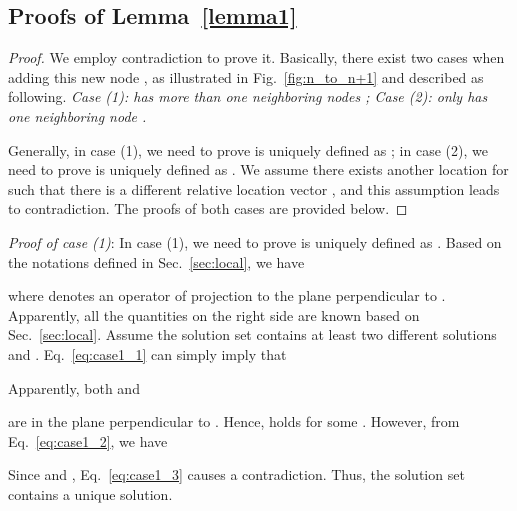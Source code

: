 \documentclass{article}
\begin{document}
\subsection{Proofs of Lemma~\ref{lemma1}} \label{sec:proof}

\captionsetup[subfigure]{labelformat=empty}
\begin{figure*}[ht]
     \centering
     \qquad
    \caption{Two cases for proving Lemma~\ref{lemma1} when generalizing the size of a 3D graph from  to .}
    \label{fig:n_to_n+1}
    \vspace{-10pt}
\end{figure*}


\begin{proof}
We employ contradiction to prove it. Basically, there exist two cases when adding this new node ,
as illustrated in Fig.~\ref{fig:n_to_n+1} and described as following.
\emph{Case (1):  has more than one neighboring nodes ;
Case (2):  only has one neighboring node .}

Generally, in case (1), we need to prove  is uniquely defined as ; in case (2), we need to prove  is uniquely defined as .
We assume there exists another location for  such that there is a different relative location vector
, and this assumption leads to contradiction.
The proofs of both cases are provided below.
\end{proof}

\emph{Proof of case (1)}:
In case (1), we need to prove  is uniquely defined as .
Based on the notations defined in Sec.~\ref{sec:local}, we have

where  denotes an operator of projection to 
the plane perpendicular to .
Apparently, all the quantities on the right side are known based on 
Sec.~\ref{sec:local}. 
Assume the solution set
contains at least two different solutions 
and .
Eq.~\ref{eq:case1_1} can simply imply that

Apparently, both  and 

are in the plane perpendicular to .
Hence, 
holds for some .
However, from Eq.~\ref{eq:case1_2}, we have

Since  and , Eq.~\ref{eq:case1_3} causes a contradiction. Thus, the solution set contains a unique solution.
\end{document}

